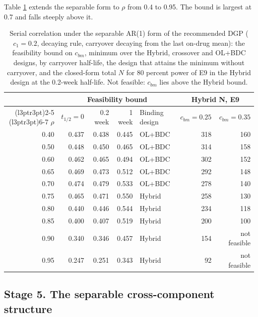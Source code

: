 \documentclass[
  11pt,
]{article}
\begin{document}
Table \ref{tab:rhobound} extends the separable form to \(\rho\) from
0.4 to 0.95. The bound is largest at 0.7 and falls steeply above it.

\begin{table}

\caption{\label{tab:rhobound}Serial correlation under the separable AR(1) form of the recommended DGP ($c_1 = 0.2$, decaying rule, carryover decaying from the last on-drug mean): the feasibility bound on $c_{bm}$, minimum over the Hybrid, crossover and OL+BDC designs, by carryover half-life, the design that attains the minimum without carryover, and the closed-form total $N$ for 80 percent power of E9 in the Hybrid design at the 0.2-week half-life. Not feasible: $c_{bm}$ lies above the Hybrid bound.}
\centering
\begin{tabular}[t]{rrrrlrr}
\toprule
\multicolumn{1}{c}{ } & \multicolumn{4}{c}{Feasibility bound} & \multicolumn{2}{c}{Hybrid N, E9} \\
\cmidrule(l{3pt}r{3pt}){2-5} \cmidrule(l{3pt}r{3pt}){6-7}
$\rho$ & $t_{1/2} = 0$ & 0.2 week & 1 week & Binding design & $c_{bm} = 0.25$ & $c_{bm} = 0.35$\\
\midrule
0.40 & 0.437 & 0.438 & 0.445 & OL+BDC & 318 & 160\\
0.50 & 0.448 & 0.450 & 0.465 & OL+BDC & 314 & 158\\
0.60 & 0.462 & 0.465 & 0.494 & OL+BDC & 302 & 152\\
0.65 & 0.469 & 0.473 & 0.512 & OL+BDC & 292 & 148\\
0.70 & 0.474 & 0.479 & 0.533 & OL+BDC & 278 & 140\\
0.75 & 0.465 & 0.471 & 0.550 & Hybrid & 258 & 130\\
0.80 & 0.440 & 0.446 & 0.544 & Hybrid & 234 & 118\\
0.85 & 0.400 & 0.407 & 0.519 & Hybrid & 200 & 100\\
0.90 & 0.340 & 0.346 & 0.457 & Hybrid & 154 & not feasible\\
0.95 & 0.247 & 0.251 & 0.343 & Hybrid & 92 & not feasible\\
\bottomrule
\end{tabular}
\end{table}

\subsection{Stage 5. The separable cross-component structure}\label{stage-5.-the-separable-cross-component-structure}
\end{document}
